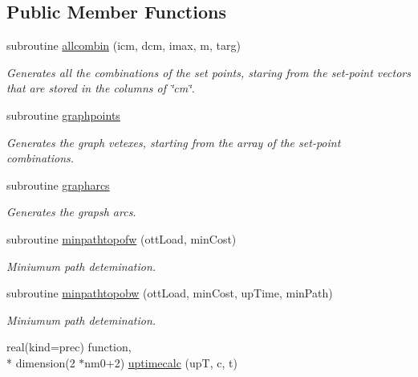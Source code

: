 \subsection*{Public Member Functions}
\begin{DoxyCompactItemize}
\item 
subroutine \hyperlink{classgraphtools_a4607d975b5dd57d2ca7fcdbab2b1ef56}{allcombin} (icm, dcm, imax, m, targ)
\begin{DoxyCompactList}\small\item\em Generates all the combinations of the set points, staring from the set-\/point vectors that are stored in the columns of \char`\"{}cm\char`\"{}. \end{DoxyCompactList}\item 
subroutine \hyperlink{classgraphtools_a94b8e6e5a3d3cc0c3bedbe00d57fc2f9}{graphpoints}
\begin{DoxyCompactList}\small\item\em Generates the graph vetexes, starting from the array of the set-\/point combinations. \end{DoxyCompactList}\item 
subroutine \hyperlink{classgraphtools_a47c76f30f7f4917536f94c642ffca865}{grapharcs}
\begin{DoxyCompactList}\small\item\em Generates the grapsh arcs. \end{DoxyCompactList}\item 
subroutine \hyperlink{classgraphtools_ade3577b19aec190e8e056f041bc8afdf}{minpathtopofw} (ott\-Load, min\-Cost)
\begin{DoxyCompactList}\small\item\em Miniumum path detemination. \end{DoxyCompactList}\item 
subroutine \hyperlink{classgraphtools_abef4e47145f628bc6d3001d4f6bd9601}{minpathtopobw} (ott\-Load, min\-Cost, up\-Time, min\-Path)
\begin{DoxyCompactList}\small\item\em Miniumum path detemination. \end{DoxyCompactList}\item 
real(kind=prec) function, \\*
dimension(2 $\ast$nm0+2) \hyperlink{classgraphtools_a4c6b1425ce7fa1411c4550e4fb5de421}{uptimecalc} (up\-T, c, t)
\end{DoxyCompactItemize}
